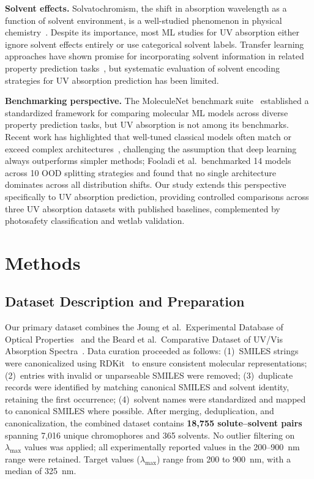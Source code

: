 \documentclass[journal=jcisd8,manuscript=article]{achemso}
\begin{document}
\textbf{Solvent effects.}
Solvatochromism, the shift in absorption wavelength as a function of solvent environment, is a well-studied phenomenon in physical chemistry~\cite{reichardt2011solvents}.
Despite its importance, most ML studies for UV absorption either ignore solvent effects entirely or use categorical solvent labels.
Transfer learning approaches have shown promise for incorporating solvent information in related property prediction tasks~\cite{vermeire2021transfer}, but systematic evaluation of solvent encoding strategies for UV absorption prediction has been limited.

\textbf{Benchmarking perspective.}
The MoleculeNet benchmark suite~\cite{wuMoleculeNet2018} established a standardized framework for comparing molecular ML models across diverse property prediction tasks, but UV absorption is not among its benchmarks.
Recent work has highlighted that well-tuned classical models often match or exceed complex architectures~\cite{panapitiya2022evaluation, walters2021applications, fooladi2025evaluating}, challenging the assumption that deep learning always outperforms simpler methods; Fooladi et al.\ benchmarked 14 models across 10 OOD splitting strategies and found that no single architecture dominates across all distribution shifts.
Our study extends this perspective specifically to UV absorption prediction, providing controlled comparisons across three UV absorption datasets with published baselines, complemented by photosafety classification and wetlab validation.


\section{Methods}
\label{sec:methods}

\subsection{Dataset Description and Preparation}
\label{sec:dataset}

Our primary dataset combines the Joung et al.\ Experimental Database of Optical Properties~\cite{joung2020experimental} and the Beard et al.\ Comparative Dataset of UV/Vis Absorption Spectra~\cite{beard2019comparative}.
Data curation proceeded as follows: (1)~SMILES strings were canonicalized using RDKit~\cite{landrumRdkitRdkit2020_03_12020} to ensure consistent molecular representations; (2)~entries with invalid or unparseable SMILES were removed; (3)~duplicate records were identified by matching canonical SMILES and solvent identity, retaining the first occurrence; (4)~solvent names were standardized and mapped to canonical SMILES where possible.
After merging, deduplication, and canonicalization, the combined dataset contains \textbf{18,755 solute--solvent pairs} spanning 7,016 unique chromophores and 365 solvents.
No outlier filtering on $\lambda_{\max}$ values was applied; all experimentally reported values in the 200--900~nm range were retained.
Target values ($\lambda_{\max}$) range from 200 to 900~nm, with a median of 325~nm.
\end{document}
